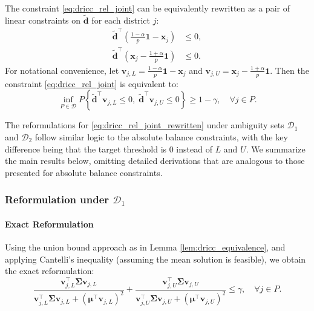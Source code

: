\documentclass[preprint,12pt,authoryear]{elsarticle}
\begin{document}
The constraint \eqref{eq:dricc_rel_joint} can be equivalently rewritten as a pair of linear constraints on $\tilde{\mathbf{d}}$ for each district $j$:
\begin{align}
\tilde{\mathbf{d}}^\top \left( \frac{1-\alpha}{p} \mathbf{1} - \mathbf{x}_j \right) &\leqslant 0, \label{eq:rel_lower_linear} \\
\tilde{\mathbf{d}}^\top \left( \mathbf{x}_j - \frac{1+\alpha}{p} \mathbf{1} \right) &\leqslant 0. \label{eq:rel_upper_linear}
\end{align}
For notational convenience, let $\mathbf{v}_{j,L} = \frac{1-\alpha}{p} \mathbf{1} - \mathbf{x}_j$ and $\mathbf{v}_{j,U} = \mathbf{x}_j - \frac{1+\alpha}{p} \mathbf{1}$. Then the constraint \eqref{eq:dricc_rel_joint} is equivalent to:
\begin{equation}
\inf_{P \in \mathcal{D}} P \left\{ \tilde{\mathbf{d}}^\top \mathbf{v}_{j,L} \leqslant 0, \; \tilde{\mathbf{d}}^\top \mathbf{v}_{j,U} \leqslant 0 \right\} \geqslant 1 - \gamma, \quad \forall j \in P.
\label{eq:dricc_rel_joint_rewritten}
\end{equation}

The reformulations for \eqref{eq:dricc_rel_joint_rewritten} under ambiguity sets $\mathcal{D}_1$ and $\mathcal{D}_2$ follow similar logic to the absolute balance constraints, with the key difference being that the target threshold is 0 instead of $L$ and $U$. We summarize the main results below, omitting detailed derivations that are analogous to those presented for absolute balance constraints.

\subsubsection{Reformulation under $\mathcal{D}_1$}

\paragraph{Exact Reformulation}
Using the union bound approach as in Lemma \ref{lem:dricc_equivalence}, and applying Cantelli's inequality (assuming the mean solution is feasible), we obtain the exact reformulation:
\begin{equation}
\frac{\mathbf{v}_{j,L}^\top \boldsymbol{\Sigma} \mathbf{v}_{j,L}}{\mathbf{v}_{j,L}^\top \boldsymbol{\Sigma} \mathbf{v}_{j,L} + (\boldsymbol{\mu}^\top \mathbf{v}_{j,L})^2} + \frac{\mathbf{v}_{j,U}^\top \boldsymbol{\Sigma} \mathbf{v}_{j,U}}{\mathbf{v}_{j,U}^\top \boldsymbol{\Sigma} \mathbf{v}_{j,U} + (\boldsymbol{\mu}^\top \mathbf{v}_{j,U})^2} \leqslant \gamma, \quad \forall j \in P.
\label{eq:rel_balance_d1_exact}
\end{equation}
\end{document}
